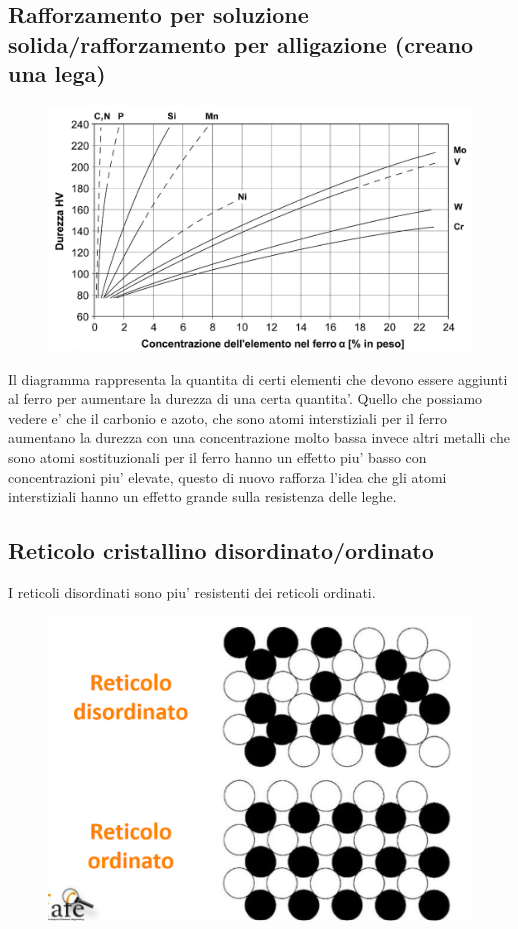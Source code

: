 \documentclass{article}
\begin{document}
        \subsection{Rafforzamento per soluzione solida/rafforzamento per alligazione (creano una lega)}
            \begin{figure}[ht]
                \centering
                \includegraphics[width=.85\linewidth]{Rafforzamento per soluzione solida.png}
            \end{figure}
            Il diagramma rappresenta la quantita di certi elementi che devono essere aggiunti al ferro per aumentare la durezza di una certa quantita'.
            Quello che possiamo vedere e' che il carbonio e azoto, che sono atomi interstiziali per il ferro aumentano la durezza con una concentrazione 
            molto bassa invece altri metalli che sono atomi sostituzionali per il ferro hanno un effetto piu' basso con concentrazioni piu' elevate, questo 
            di nuovo rafforza l'idea che gli atomi interstiziali hanno un effetto grande sulla resistenza delle leghe.
        \subsection{Reticolo cristallino disordinato/ordinato}
            I reticoli disordinati sono piu' resistenti dei reticoli ordinati.
            \begin{figure}[ht]
                \centering
                \includegraphics[width=.75\linewidth]{Disordinato Ordinato.png}
            \end{figure}
\end{document}
